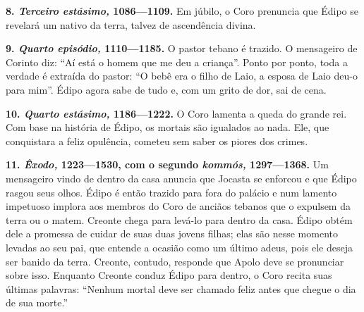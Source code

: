 \textbf{8. \emph{Terceiro estásimo,} 1086---1109.} Em júbilo, o Coro
prenuncia que Édipo se revelará um nativo da terra, talvez de
ascendência divina.

\textbf{9. \emph{Quarto episódio,} 1110---1185.} O pastor tebano é
trazido. O mensageiro de Corinto diz: ``Aí está o homem que me deu a
criança''. Ponto por ponto, toda a verdade é extraída do pastor: ``O
bebê era o filho de Laio, a esposa de Laio deu-o para mim''. Édipo agora
sabe de tudo e, com um grito de dor, sai de cena.

\textbf{10. \emph{Quarto estásimo,} 1186---1222.} O Coro lamenta a queda
do grande rei. Com base na história de Édipo, os mortais são igualados
ao nada. Ele, que conquistara a feliz opulência, cometeu sem saber os
piores dos crimes.

\textbf{11. \emph{Êxodo,} 1223---1530, com o segundo \emph{kommós,}
1297---1368.} Um mensageiro vindo de dentro da casa anuncia que Jocasta
se enforcou e que Édipo rasgou seus olhos. Édipo é então trazido para
fora do palácio e num lamento impetuoso implora aos membros do Coro de
anciãos tebanos que o expulsem da terra ou o matem. Creonte chega para
levá-lo para dentro da casa. Édipo obtém dele a promessa de cuidar de
suas duas jovens filhas; elas são nesse momento levadas ao seu pai, que
entende a ocasião como um último adeus, pois ele deseja ser banido da
terra. Creonte, contudo, responde que Apolo deve se pronunciar sobre
isso. Enquanto Creonte conduz Édipo para dentro, o Coro recita suas
últimas palavras: ``Nenhum mortal deve ser chamado feliz antes que
chegue o dia de sua morte.''